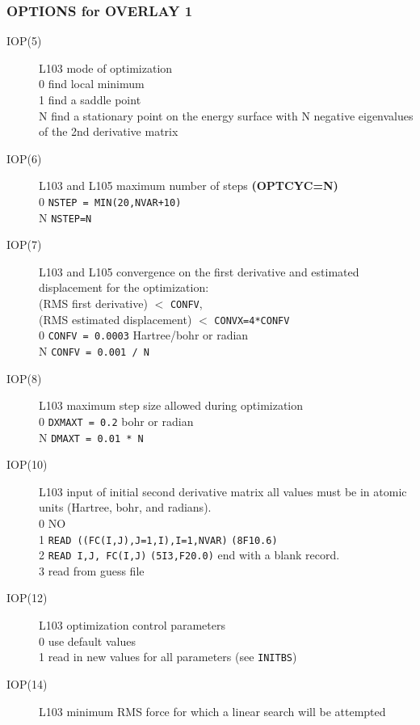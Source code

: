 \subsubsection{\sf OPTIONS for OVERLAY 1}
\begin{description}
\item[IOP(5)] L103  mode of optimization  \\
0  find local minimum \\
1  find a saddle point \\ 
N find a stationary point on the energy surface with N negative
eigenvalues of the 2nd derivative matrix
\item[IOP(6)] L103 and L105  maximum number of steps {\bf (OPTCYC=N)} \\
0  {\tt NSTEP = MIN(20,NVAR+10)} \\
N {\tt NSTEP=N}
\item[IOP(7)] L103 and L105  convergence on the first derivative
and estimated displacement for the optimization:  \\
(RMS first derivative) $<$ {\tt CONFV}, \\
(RMS estimated displacement) $<$ {\tt CONVX=4*CONFV} \\
0  {\tt CONFV = 0.0003} Hartree/bohr or radian \\
N {\tt CONFV = 0.001 / N}
\item[IOP(8)] L103  maximum step size allowed during optimization \\
0  {\tt DXMAXT = 0.2} bohr or radian \\
N {\tt DMAXT = 0.01 * N}
\item[IOP(10)] L103  input of initial second derivative matrix
all values must be in atomic units (Hartree, bohr, and radians). \\
0  NO \\
1 {\tt READ ((FC(I,J),J=1,I),I=1,NVAR)}  {\tt (8F10.6)} \\
2  {\tt READ I,J, FC(I,J)}      {\tt (5I3,F20.0)} end with a blank record. \\
3  read from guess file \\
\item[IOP(12)] L103  optimization control parameters \\
0  use default values \\
1  read in new values for all parameters (see {\tt INITBS}) \\
\item[IOP(14)] L103  minimum RMS force for which a linear search
will be attempted  \\

\end{description}
